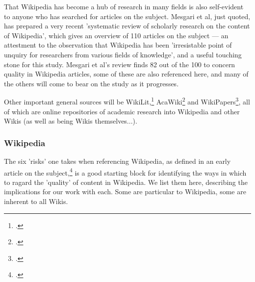 \documentclass[a4paper,11pt,twoside,notitlepage]{article}
\renewcommand{\cite}[1]{\footcite{#1}}
\begin{document}
        That Wikipedia has become a hub of research in many fields is
        also self-evident to anyone who has searched for articles on
        the subject. Mesgari et al, just quoted, has prepared a very
        recent 'systematic review of scholarly research on the content
        of Wikipedia', which gives an overview of 110 articles on the
        subject --- an attestment to the observation that Wikipedia
        has been 'irresistable point of unquiry for researchers from
        various fields of knowledge', and a useful touching stone for
        this study. Mesgari et al's review finds 82 out of the 100 to
        concern quality in Wikipedia articles, some of these are also
        referenced here, and many of the others will come to bear on
        the study as it progresses.

        Other important general sources will be WikiLit,\cite{wikilit}
        AcaWiki\cite{acawiki} and WikiPapers\cite{wikipapers}, all of
        which are online repositories of academic research into
        Wikipedia and other Wikis (as well as being Wikis
        themselves...).

        \subsubsection{Wikipedia}
        The six 'risks' one takes when referencing Wikipedia, as
        defined in an early article on the subject,\cite{Denning2005}
        is a good starting block for identifying the ways in which to
        ragard the 'quality' of content in Wikipedia. We list them
        here, describing the implications for our work with each. Some
        are particular to Wikipedia, some are inherent to all Wikis.
        
\end{document}
